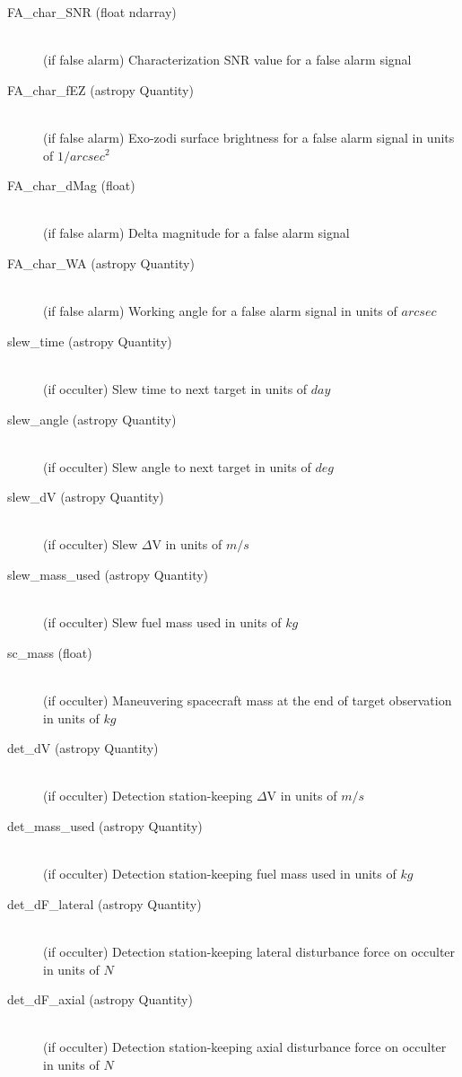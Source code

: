 \documentclass[cleanfoot]{asme2ej}
\begin{document}
\begin{itemize}
\begin{description}
\begin{description}
        \item[FA\_char\_SNR (float ndarray)] \hfill \\ (if false alarm) Characterization SNR value for a false alarm signal
        \item[FA\_char\_fEZ (astropy Quantity)] \hfill \\ (if false alarm) Exo-zodi surface brightness for a false alarm signal in units of $1/arcsec^2$
        \item[FA\_char\_dMag (float)] \hfill \\ (if false alarm) Delta magnitude for a false alarm signal
        \item[FA\_char\_WA (astropy Quantity)] \hfill \\ (if false alarm) Working angle for a false alarm signal in units of $arcsec$
        \item[slew\_time (astropy Quantity)] \hfill \\ (if occulter) Slew time to next target in units of $ day $
        \item[slew\_angle (astropy Quantity)] \hfill \\ (if occulter) Slew angle to next target in units of $ deg $
        \item[slew\_dV (astropy Quantity)] \hfill \\ (if occulter) Slew $\Delta$V in units of $ m/s $
        \item[slew\_mass\_used (astropy Quantity)] \hfill \\ (if occulter) Slew fuel mass used in units of $ kg $
        \item[sc\_mass (float)] \hfill \\ (if occulter) Maneuvering spacecraft mass at the end of target observation in units of $kg$
        \item[det\_dV (astropy Quantity)] \hfill \\ (if occulter) Detection station-keeping $\Delta$V in units of $ m/s $
        \item[det\_mass\_used (astropy Quantity)] \hfill \\ (if occulter) Detection station-keeping fuel mass used in units of $ kg $
        \item[det\_dF\_lateral (astropy Quantity)] \hfill \\ (if occulter) Detection station-keeping lateral disturbance force on occulter in units of $ N $
        \item[det\_dF\_axial (astropy Quantity)] \hfill \\ (if occulter) Detection station-keeping axial disturbance force on occulter in units of $ N $

\end{description}
\end{description}
\end{itemize}
\end{document}

